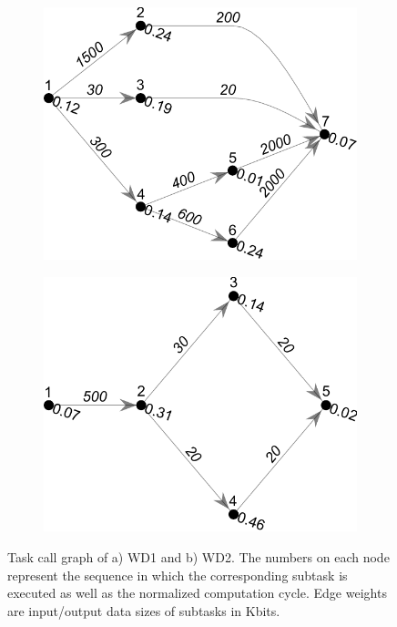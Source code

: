 \documentclass[12pt,draftclsnofoot,onecolumn]{IEEEtran}
\begin{document}
\begin{figure}
	\centering
	\begin{subfigure}{.2\textwidth}
		\centering
		\includegraphics[width=\linewidth]{tcg1.pdf}
		\caption{}
		\label{fig:5a}
	\end{subfigure}\hspace{6mm}
	\begin{subfigure}{.2\textwidth}
		\centering
		\includegraphics[width=\linewidth]{tcg2.pdf}
		\caption{}
		\label{fig:5b}
	\end{subfigure}
	
	\caption{Task call graph of a) WD1 and b) WD2. The numbers on each node represent the sequence in which the corresponding subtask is executed as well as the normalized computation cycle. Edge weights are input/output data sizes of subtasks in Kbits.} \label{fig:5}
\end{figure}
\end{document}
